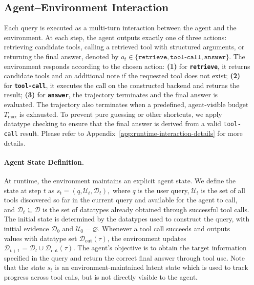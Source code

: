 \documentclass{llmxive}
\begin{document}
\subsection{Agent--Environment Interaction}

Each query is executed as a multi-turn interaction between the agent and the environment.
At each step, the agent outputs exactly one of three actions:
retrieving candidate tools, calling a retrieved tool with structured arguments, or returning the final answer, denoted by
$a_t \in \{\texttt{retrieve}, \texttt{tool-call}, \texttt{answer}\}$.
The environment responds according to the chosen action:
\textbf{(1)} for \textbf{\texttt{retrieve}}, it returns candidate tools and an additional note if the requested tool does not exist;
\textbf{(2)} for \textbf{\texttt{tool-call}}, it executes the call on the constructed backend and returns the result;
\textbf{(3)} for \textbf{\texttt{answer}}, the trajectory terminates and the final answer is evaluated.
The trajectory also terminates when a predefined, agent-visible budget $T_{\max}$ is exhausted.
To prevent pure guessing or other shortcuts, we apply datatype checking to ensure that the final answer is derived from a valid \texttt{tool-call} result. 
Please refer to Appendix~\ref{app:runtime-interaction-details} for more details.

\paragraph{Agent State Definition.} At runtime, the environment maintains an explicit agent state. 
We define the state at step $t$ as $s_t = (q, \mathcal{U}_t, \mathcal{D}_t),$ where $q$ is the user query, $\mathcal{U}_t$ is the set of all tools discovered so far in the current query and available for the agent to call, and $\mathcal{D}_t \subseteq \mathcal{D}$ is the set of datatypes already obtained through successful tool calls. 
The initial state is determined by the datatypes used to construct the query, with initial evidence $\mathcal{D}_0$ and $\mathcal{U}_0=\varnothing$. 
Whenever a tool call succeeds and outputs values with datatype set $\mathcal{D}_{\mathrm{out}}(\tau)$, the environment updates $\mathcal{D}_{t+1}=\mathcal{D}_t \cup \mathcal{D}_{\mathrm{out}}(\tau)$.
The agent's objective is to obtain the target information specified in the query and return the correct final answer through tool use.
Note that the state $s_t$ is an environment-maintained latent state which is used to track progress across tool calls, but is not directly visible to the agent.
\end{document}
